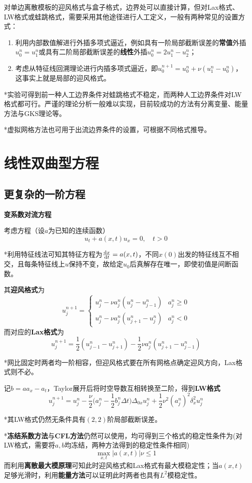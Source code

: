 \documentclass[a4paper,UTF8,fontset=windows]{ctexart}
\newcommand*{\dr}{\hspace{0.07em}\mathrm{d}}
\begin{document}
对单边离散模板的迎风格式与盒子格式，边界处可以直接计算，但对Lax格式、LW格式或蛙跳格式，需要采用其他途径进行人工定义，一般有两种常见的设置方式：
\begin{enumerate}
    \item 利用内部数值解进行外插多项式逼近，例如具有一阶局部截断误差的\textbf{常值}外插$u_0^n=u_1^n$或具有二阶局部截断误差的\textbf{线性}外插$u_0^n=2u_1^n-u_2^n$；
    \item 考虑从特征线回溯理论进行内插多项式逼近，即$u_0^{n+1}=u_0^n+\nu(u_1^n-u_0^n)$，这事实上就是局部的迎风格式。
\end{enumerate}

*实验可得到前一种人工边界条件对蛙跳格式不稳定，而两种人工边界条件对LW格式都可行。严谨的理论分析一般难以实现，目前较成功的方法有分离变量、能量方法与GKS理论等。

*虚拟网格方法也可用于出流边界条件的设置，可根据不同格式推导。

\section{线性双曲型方程}
\subsection{更复杂的一阶方程}
\textbf{变系数对流方程}

考虑方程（设$a$为已知的连续函数）
$$u_t+a(x,t)u_x=0,\quad t>0$$

*利用特征线法可知其特征方程为$\frac{\dr x}{\dr t}=a(x,t)$，不同$x(0)$出发的特征线互不相交，且每条特征线上$u$保持不变，故给定$u_0$后真解存在唯一，即使初值是间断函数。

其\textbf{迎风格式}为
$$u_j^{n+1}=\begin{cases}u_j^n-\nu a_j^n(u_j^n-u_{j-1}^n)&a_j^n\ge0\\u_j^n-\nu a_j^n(u_{j+1}^n-u_j^n)&a_j^n<0\end{cases}$$
而对应的\textbf{Lax格式}为
$$u_j^{n+1}=\frac{1}{2}(u_{j-1}^n-u_{j+1}^n)-\frac{1}{2}\nu a_j^n(u_{j+1}^n-u_{j-1}^n)$$

*网比固定时两者均一阶相容，但迎风格式要在所有网格点确定迎风方向，Lax格式则不必。

记$b=aa_x-a_t$，Taylor展开后将时空导数互相转换至二阶，得到\textbf{LW格式}
$$u_j^{n+1}=u_j^n-\frac{\nu}{2}\bigg(a_j^n-\frac{1}{2}b_j^n\Delta t\bigg)\Delta_{0x}u_j^n+\frac{1}{2}\nu^2(a_j^n)^2\delta_x^2u_j^n$$

*其LW格式仍然无条件具有$(2,2)$阶局部截断误差。

*\textbf{冻结系数方法}与\textbf{CFL方法}仍然可以使用，均可得到三个格式的稳定性条件为(对LW格式，需要将$a,b$均冻结，两种方法得到的稳定性条件相同)
$$\max_{x,t}|a(x,t)|\nu\le1$$
而利用\textbf{离散最大模原理}可知此时迎风格式和Lax格式有最大模稳定性；当$a(x,t)$足够光滑时，利用\textbf{能量方法}可以证明此时两者也具有$L^2$模稳定性。
\end{document}
